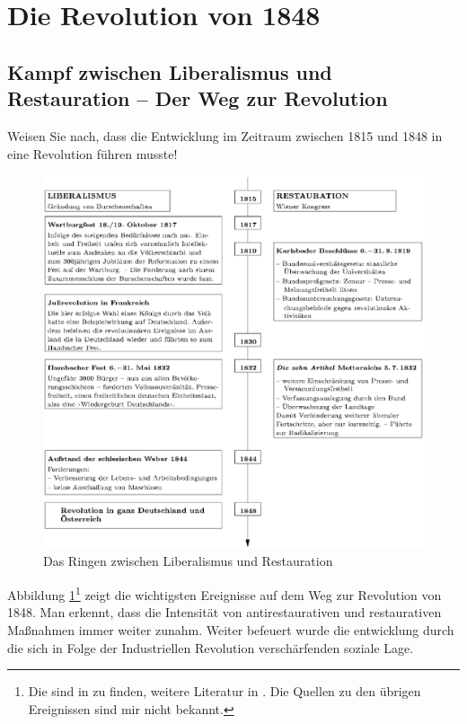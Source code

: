 \section{Die Revolution von 1848}
\label{sec:rev-1848}

\subsection{Kampf zwischen Liberalismus und Restauration -- Der Weg
zur Revolution}
\label{ssc:kampf-lib-res}

\begin{aufgabe}
Weisen Sie nach, dass die Entwicklung im Zeitraum zwischen 1815 und
1848 in eine Revolution führen musste!
\end{aufgabe}

\begin{figure}
\includegraphics[width=\textwidth]{kampf-lib-rest.eps}
\caption{Das Ringen zwischen Liberalismus und Restauration}
\label{pic:kampf-lib-rest}
\end{figure}

Abbildung \ref{pic:kampf-lib-rest}\footnote{Die 
 sind in
\cite{ZehnArt} zu finden, weitere Literatur in
\cite[106]{braunesGeschichts}. Die Quellen zu den übrigen Ereignissen
sind mir nicht bekannt.} zeigt die wichtigsten Ereignisse auf dem Weg
zur Revolution von 1848. Man erkennt, dass die Intensität von
antirestaurativen und restaurativen Maßnahmen immer weiter zunahm.
Weiter befeuert wurde die entwicklung durch die sich in Folge der
Industriellen Revolution verschärfenden soziale Lage.

